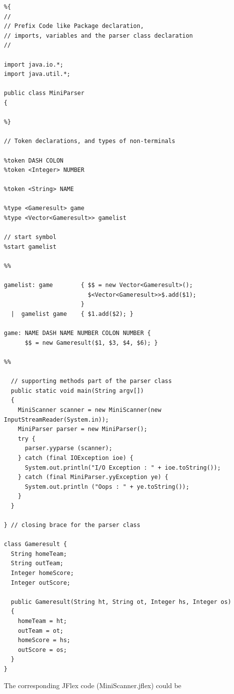 \begin{verbatim}
%{
//
// Prefix Code like Package declaration, 
// imports, variables and the parser class declaration
// 

import java.io.*;
import java.util.*;

public class MiniParser 
{

%}

// Token declarations, and types of non-terminals

%token DASH COLON
%token <Integer> NUMBER

%token <String> NAME

%type <Gameresult> game
%type <Vector<Gameresult>> gamelist

// start symbol
%start gamelist

%%

gamelist: game        { $$ = new Vector<Gameresult>();
                        $<Vector<Gameresult>>$.add($1);
                      }
  |  gamelist game    { $1.add($2); }

game: NAME DASH NAME NUMBER COLON NUMBER {
      $$ = new Gameresult($1, $3, $4, $6); }

%%

  // supporting methods part of the parser class
  public static void main(String argv[])
  {
    MiniScanner scanner = new MiniScanner(new InputStreamReader(System.in));
    MiniParser parser = new MiniParser();
    try {
      parser.yyparse (scanner);
    } catch (final IOException ioe) {
      System.out.println("I/O Exception : " + ioe.toString());
    } catch (final MiniParser.yyException ye) {
      System.out.println ("Oops : " + ye.toString());
    }
  }

} // closing brace for the parser class

class Gameresult {
  String homeTeam;
  String outTeam;
  Integer homeScore;
  Integer outScore;

  public Gameresult(String ht, String ot, Integer hs, Integer os)
  {
    homeTeam = ht;
    outTeam = ot;
    homeScore = hs;
    outScore = os;
  }
}
\end{verbatim}

The corresponding JFlex code (MiniScanner.jflex) could be

